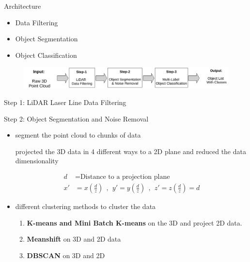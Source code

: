 \documentclass[9pt]{beamer}
\begin{document}

\begin{frame}[fragile]{Architecture}
\begin{itemize}
	\item {} Data Filtering  
	\item {} Object Segmentation
	\item {} Object Classification   
\end{itemize}

\begin{figure}
	\centering
	\includegraphics[width=\textwidth]{images/DataProcessingPipleline.pdf}

\end{figure}
\end{frame}



\begin{frame}[fragile]{Step 1: LiDAR Laser Line Data Filtering}

\end{frame}


\begin{frame}[fragile]{Step 2: Object Segmentation and Noise Removal}
	\begin{itemize}
		\item segment the point cloud to chunks of data 
		
		
		 projected the 3D data in 4 different ways to a 2D plane and reduced the data dimensionality
		
		\begin{align*}
		d  & = \text{Distance to a projection plane} \\
		x' & =  x (\frac{d}{z}) \ \  , \ \  y' =  y (\frac{d}{z}) \ \  , \ \  z'=  z (\frac{d}{z}) = d
		\end{align*}
		
		
		\item different clustering methods to cluster the data		
		\begin{enumerate}
			\item \textbf{K-means and Mini Batch K-means} on the 3D and project 2D data.
			\item \textbf{Meanshift} on 3D and 2D data
			\item \textbf{DBSCAN} on 3D and 2D
		\end{enumerate}
	\end{itemize}
\end{frame}
\end{document}

